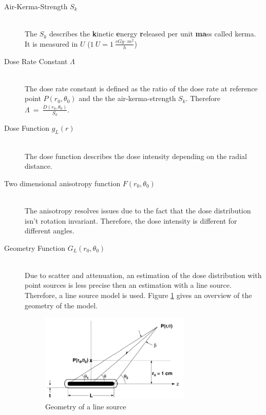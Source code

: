 \documentclass[12pt]{article}
\begin{document}
\begin{description}
\item[Air-Kerma-Strength $S_{k}$]~\\
The $S_{k}$ describes the \textbf{k}inetic \textbf{e}nergy \textbf{r}eleased per unit \textbf{ma}ss called kerma. It is measured in $U$ ($1\ U =1 \ \frac{cGy \cdot m^{2}}{h} $)   
\item[Dose Rate Constant $\Lambda$]~\\
The dose rate constant is defined as the ratio of the dose rate at reference point $ P(r_{0},\theta_{0})  $ and the the air-kerma-strength $S_{k}$. Therefore $ \Lambda \ = \ \frac{\dot{D}(r_{0},\theta_{0})}{S_{k}} $.



\item[Dose Function $g_{L}(r)$]~\\
The dose function describes the dose intensity depending on the radial distance.


\item[Two dimensional anisotropy function $ F(r_{0},\theta_{0})$]~\\
The anisotropy resolves issues due to the fact that the dose distribution isn't rotation invariant. Therefore, the dose intensity is different for different angles.


\item[Geometry Function $G_{L}(r_{0},\theta_{0})$ ]~\\
Due to scatter and attenuation, an estimation of the dose distribution with point sources is less precise then an estimation with a line source. Therefore, a line source model is used. Figure \ref{fig:geometry} gives an overview of the geometry of the model.

\begin{figure}[hbtp]


\centering
\includegraphics[width=0.7\textwidth]{pictures/geometry}
\caption{Geometry of a line source}
\label{fig:geometry}	
\end{figure}
\end{description}
\end{document}
